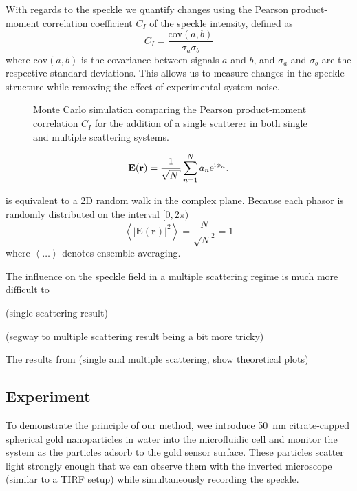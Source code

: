With regards to the speckle we quantify changes using the Pearson
product-moment correlation coefficient $C_I$ of the speckle intensity,
defined as 
\begin{equation}
C_I = \frac{\mathrm{cov}(a,b)}{\sigma_a \sigma_b}
\label{eqn:pearsonproductmoment}
\end{equation}
where $\mathrm{cov}(a,b)$ is the covariance between signals $a$ and $b$,
and $\sigma_a$ and $\sigma_b$ are the respective standard deviations.  This
allows us to measure changes in the speckle structure while removing the
effect of experimental system noise.

\begin{figure}
\centering
\caption{Monte Carlo simulation comparing the Pearson product-moment
				correlation $C_I$ for the addition of a single scatterer in both
				single and multiple scattering systems.}
\label{fig:scatteringpearson}
\end{figure}


\begin{equation}
\mathbf{E}(\mathbf{r}) = \frac{1}{\sqrt{N}} \sum_{n=1}^{N} a_n \me^{\mi \phi_n}.
\label{eqn:phasorsumdingus}
\end{equation}

 is equivalent to a 2D random walk in the
complex plane.  Because each phasor is randomly distributed on the interval
$[0,2\pi)$
\begin{equation}
\left<|\mathbf{E}(\mathbf{r})|^2\right> = \frac{N}{\sqrt{N}^2} = 1
\end{equation}
where $\left<\dots\right>$ denotes ensemble averaging.  

The influence on the speckle field in a multiple scattering regime is much
more difficult to 

(single scattering result)

(segway to multiple scattering result being a bit more tricky)


The results from (single and multiple scattering, show theoretical plots)



\subsection{Experiment}
To demonstrate the principle of our method, wee introduce
\SI{50}{\nano\meter} citrate-capped spherical gold nanoparticles in water
into the microfluidic cell and monitor the system as the particles adsorb
to the gold sensor surface.  These particles scatter light strongly enough
that we can observe them with the inverted microscope (similar to a TIRF
setup) while simultaneously recording the speckle. 

